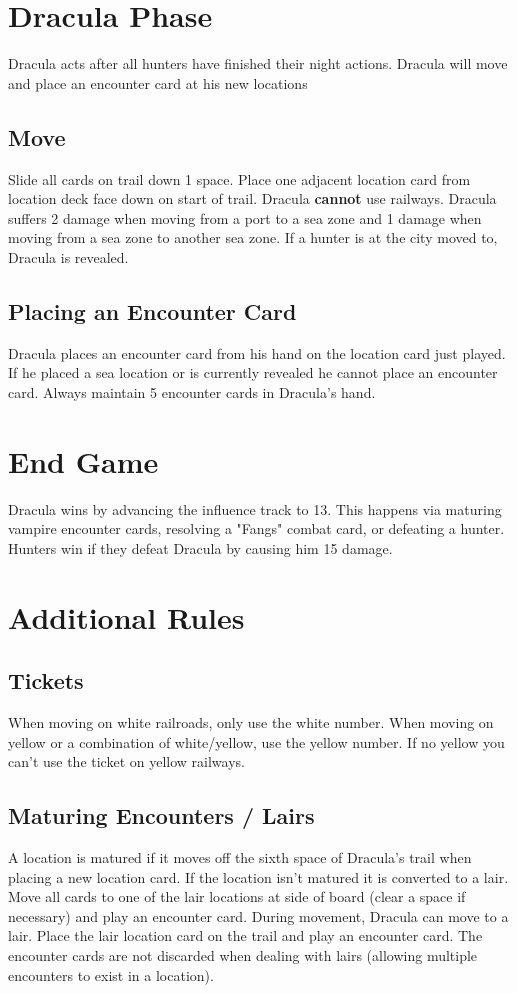 \documentclass[12pt]{article}
\begin{document}
\begin{multicols*}{2}
\section*{Dracula Phase}
Dracula acts after all hunters have finished their night actions. Dracula will move and place an encounter card at his new locations

\subsection*{Move}
Slide all cards on trail down 1 space. Place one adjacent location card from location deck face down on start of trail. Dracula \textbf{cannot} use railways. Dracula suffers 2 damage when moving from a port to a sea zone and 1 damage when moving from a sea zone to another sea zone. If a hunter is at the city moved to, Dracula is revealed.

\subsection*{Placing an Encounter Card}
Dracula places an encounter card from his hand on the location card just played. If he placed a sea location or is currently revealed he cannot place an encounter card. Always maintain 5 encounter cards in Dracula's hand.

\section*{End Game}
Dracula wins by advancing the influence track to 13. This happens via maturing vampire encounter cards, resolving a "Fangs" combat card, or defeating a hunter. Hunters win if they defeat Dracula by causing him 15 damage.

\section*{Additional Rules}
\subsection*{Tickets}
When moving on white railroads, only use the white number. When moving on yellow or a combination of white/yellow, use the yellow number. If no yellow you can't use the ticket on yellow railways.

\subsection*{Maturing Encounters / Lairs}
A location is matured if it moves off the sixth space of Dracula's trail when placing a new location card. If the location isn't matured it is converted to a lair. Move all cards to one of the lair locations at side of board (clear a space if necessary) and play an encounter card. During movement, Dracula can move to a lair. Place the lair location card on the trail and play an encounter card. The encounter cards are not discarded when dealing with lairs (allowing multiple encounters to exist in a location).


\end{multicols*}
\end{document}
